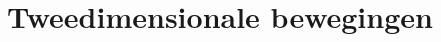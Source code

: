 \documentclass{xourse}
\begin{document}
 

    














\part{Tweedimensionale bewegingen}
\end{document}

